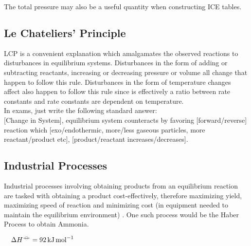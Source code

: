 \documentclass[../main]{subfiles}
\begin{document}
	The total pressure may also be a useful quantity when constructing ICE tables.


	\subsection{Le Chateliers' Principle}


	LCP is a convenient explanation which amalgamates the observed reactions to disturbances in equilibrium systems. Disturbances in the form of adding or subtracting reactants, increasing or decreasing pressure or volume all change  that happen to follow this rule. Disturbances in the form of temperature changes affect  also happen to follow this rule since  is effectively a ratio between rate constants and rate constants are dependent on temperature. \\

	In exams, just write the following standard answer: \\

	[Change in System], equilibrium system counteracts by favoring [forward/reverse] reaction which [exo/endothermic, more/less gaseous particles, more reactant/product etc], [product/reactant increases/decreases]. 

	\subsection{Industrial Processes}

	Industrial processes involving obtaining products from an equilibrium reaction are tasked with obtaining a product cost-effectively, therefore maximizing yield, maximizing speed of reaction and minimizing cost (in equipment needed to maintain the equilibrium environment) . One such process would be the Haber Process to obtain Ammonia.

	\begin{center}  \(\quad \Delta H^\plimsoll = \SI{92}{\kJ\per\mol}\) \end{center}
\end{document}
